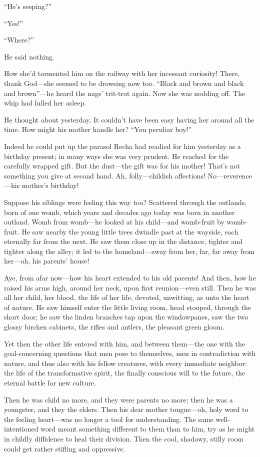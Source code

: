 \documentclass[12pt,a4paper]{article}
\begin{document}
“He’s seeping?”

“Yes!”

“Where?”

He said nothing.

How she’d tormented him on the railway with her incessant curiosity!  There, thank God—she seemed to be drowsing now too. “Black and brown and black and brown”—he heard the nags’ trit-trot again. Now she was nodding off. The whip had lulled her asleep.

He thought about yesterday. It couldn’t have been easy having her around all the time. How might his mother handle her? “You peculiar boy!”

Indeed he could put up the parasol Recha had readied for him yesterday as a birthday present; in many ways she was very prudent. He reached for the carefully wrapped gift. But the dust—the gift was for his mother! That’s not something you give at second hand. Ah, folly—childish affections! No—reverence—his mother’s birthday!

Suppose his siblings were feeling this way too? Scattered through the outlands, born of one womb, which years and decades ago today was born in another outland. Womb from womb—he looked at his child—and womb-fruit by womb-fruit. He saw nearby the young little trees dwindle past at the wayside, each eternally far from the next. He saw them close up in the distance, tighter and tighter along the alley; it led to the homeland—away from her, far, far away from her—oh, his parents’ house!

Aye, from afar now—how his heart extended to his old parents! And then, how he raised his arms high, around her neck, upon first reunion—even still. Then he was all her child, her blood, the life of her life, devoted, unwitting, as unto the heart of nature. He saw himself enter the little living room, head stooped, through the short door; he saw the linden branches tap upon the windowpanes, saw the two glossy birchen cabinets, the rifles and antlers, the pleasant green gloom.

Yet then the other life entered with him, and between them—the one with the goal-concerning questions that men pose to themselves, men in contradiction with nature, and thus also with his fellow creatures, with every immediate neighbor: the life of the transformative spirit, the finally conscious will to the future, the eternal battle for new culture.

Then he was child no more, and they were parents no more; then he was a youngster, and they the elders. Then his dear mother tongue—oh, holy word to the feeling heart—was no longer a tool for understanding. The same well-intentioned word meant something different to them than to him, try as he might in childly diffidence to heal their division. Then the cool, shadowy, stilly room could get rather stifling and oppressive.
\end{document}
